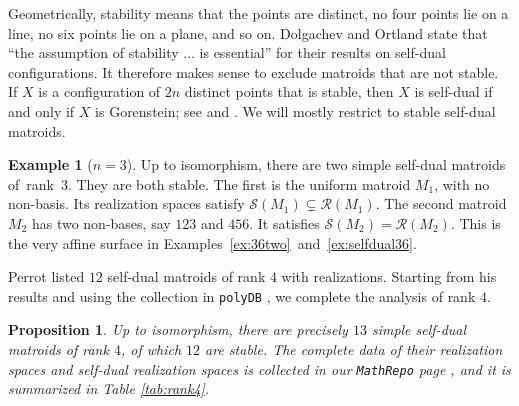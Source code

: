 \documentclass[12pt]{extarticle}
\newtheorem{proposition}[theorem]{Proposition}
\theoremstyle{definition}
\newtheorem{example}[theorem]{Example}
\numberwithin{theorem}{section}
\theoremstyle{plain}\newtheorem{ithm}{Theorem}
\begin{document}
Geometrically, stability
  means that  the points are distinct, no four points lie on a line, no six points lie on
a plane, and so on.  Dolgachev and Ortland  \cite[Remark 3, page 47]{DO}
state that ``the assumption of stability ... is essential'' for their results on self-dual configurations.
It therefore makes sense to exclude matroids that are not stable.  If $X$ is a configuration of $2n$ distinct points that is stable, then $X$ is self-dual if and only if $X$ is Gorenstein;
see \cite[Theorem~7.3]{EP} and \cite[Proposition~1.1]{EP2}. We will 
mostly restrict to stable self-dual matroids.

\begin{example}[$n=3$]
Up to isomorphism, there are
two simple self-dual matroids of~rank~$3$. They are both stable.
The first is the uniform matroid $M_1$, with no non-basis.
Its realization spaces satisfy $\mathcal{S}(M_1) \subsetneq \mathcal{R}(M_1)$.
The second matroid $M_2$ has two non-bases, say
$123$ and $456 $. It satisfies $\mathcal{S}(M_2) = \mathcal{R}(M_2)$.
This is the very affine surface 
 in Examples~\ref{ex:36two}~and~\ref{ex:selfdual36}.
\end{example}


Perrot  \cite[Figure 2.4]{Per} listed $12$ self-dual matroids of rank $4$  with realizations. Starting from his results and using the collection in \texttt{polyDB} \cite{Paf}, we complete the analysis of rank $4$.

\begin{proposition} \label{prop:rank4}
Up to isomorphism, there are precisely $13$ simple self-dual matroids of rank $4$, of which $12$ are stable. The complete data of their realization spaces and self-dual realization spaces is collected 
in our {\tt MathRepo} page
 \cite{MathRepo}, and it is summarized in Table \ref{tab:rank4}. 
\end{proposition}
\end{document}
